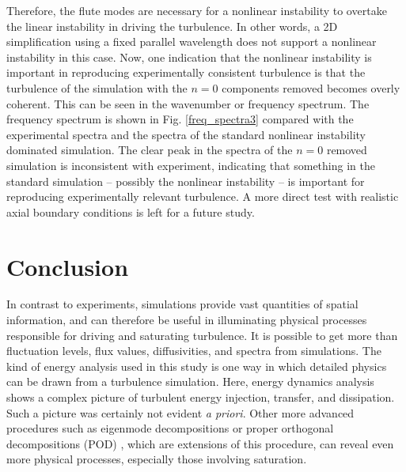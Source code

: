 \documentclass[twocolumn,showpacs,preprintnumbers,amsmath,amssymb]{revtex4}
\begin{document}
Therefore, the flute modes are necessary for a nonlinear instability to overtake the linear instability in driving the turbulence. In other words, a 2D simplification
using a fixed parallel wavelength does not support a nonlinear instability in this case.
Now, one indication that the nonlinear instability is important in reproducing experimentally consistent turbulence 
is that the turbulence of the simulation with the $n=0$ components removed becomes overly coherent. This can be seen in the
wavenumber or frequency spectrum. The frequency spectrum is shown in Fig. \ref{freq_spectra3} compared with the experimental spectra and the spectra of the standard nonlinear instability
dominated simulation. The clear peak in the spectra of the $n=0$ removed simulation is inconsistent with experiment, indicating that something in the standard simulation -- possibly
the nonlinear instability -- is important for reproducing experimentally relevant turbulence. A more direct test with realistic axial boundary conditions is left for a future study.


\section{Conclusion}

In contrast to experiments, simulations provide vast quantities of spatial information, and can therefore be useful in illuminating physical processes responsible for driving and saturating
turbulence. It is possible to get more than fluctuation levels, flux values, diffusivities, and spectra from simulations. The kind of energy analysis used in this study is one 
way in which detailed physics can be drawn from a turbulence simulation. Here, energy dynamics analysis shows a complex picture of turbulent energy injection, transfer, and dissipation. 
Such a picture was certainly not evident \emph{a priori}.
Other more advanced procedures such as eigenmode decompositions \cite{baver2002} or proper orthogonal decompositions (POD) \cite{hatch2011}, which are extensions of this procedure,
can reveal even more physical processes, especially those involving saturation. 
\end{document}
